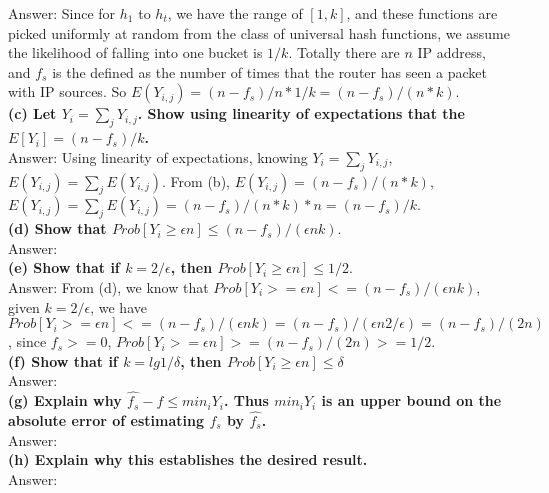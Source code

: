 \documentclass{article}
\begin{document}
Answer: Since for $h_1$ to $h_t$, we have the range of $[1,k]$, and these functions are picked uniformly at random from the class of universal hash functions, we assume the likelihood of falling into one bucket is $1/k$. Totally there are $n$ IP address, and $f_s$ is the defined as the number of times that the router has seen a packet with IP sources. So $E(Y_{i,j}) =(n-f_s)/n * 1/k = (n-f_s)/(n*k)$.\\ \newline
\textbf{(c) Let $Y_i = \sum_jY_{i,j}$. Show using linearity of expectations that the $E[Y_i] = (n - f_s)/k$.} \\ \newline
Answer: Using linearity of expectations, knowing $Y_i = \sum_{j} Y_{i,j}$, $E(Y_{i,j}) =  \sum_{j} E(Y_{i,j})$. From (b), $E(Y_{i,j}) = (n-f_s)/(n*k)$,  $E(Y_{i,j}) =  \sum_{j} E(Y_{i,j}) =(n-f_s)/(n*k) * n =  (n-f_s)/k$.\\ \newline
\textbf{(d) Show that $Prob[Y_i \geq \epsilon n] \leq (n - f_s)/(\epsilon nk)$}. \\ \newline
Answer: \\ \newline
\textbf{(e) Show that if $k = 2/\epsilon$, then $Prob[Y_i \geq \epsilon n] \leq 1/2$}. \\ \newline
Answer: From (d), we know that $Prob[Y_i>=\epsilon n] <= (n-f_s)/(\epsilon nk)$, given $k = 2/\epsilon$, we have $Prob[Y_i>=\epsilon n] <= (n-f_s)/(\epsilon nk) = (n-f_s)/(\epsilon n 2/\epsilon) = (n-f_s)/(2n)$, since $f_s>=0$,  $Prob[Y_i>=\epsilon n] > = (n-f_s)/(2n) >=1/2$.\\ \newline
\textbf{(f) Show that if $k = lg1/\delta$, then $Prob[Y_i \geq \epsilon n] \leq \delta$} \\ \newline
Answer: \\ \newline
\textbf{(g) Explain why $\hat{f_{s}} - f \leq min_i Y_i$. Thus $min_i Y_i$ is an upper bound on the absolute error of estimating $f_s$ by $\hat{f_{s}}$.} \\ \newline
Answer: \\ \newline
\textbf{(h) Explain why this establishes the desired result.} \\ \newline
Answer:\\ \newline
\end{document}
